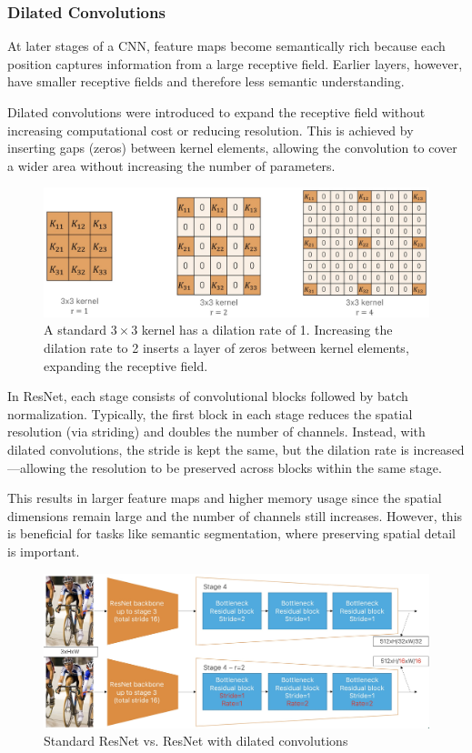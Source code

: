 \subsubsection{Dilated Convolutions}

At later stages of a CNN, feature maps become semantically rich because each position captures information from a large receptive field. Earlier layers, however, have smaller receptive fields and therefore less semantic understanding.

Dilated convolutions were introduced to expand the receptive field without increasing computational cost or reducing resolution. This is achieved by inserting gaps (zeros) between kernel elements, allowing the convolution to cover a wider area without increasing the number of parameters.

\begin{figure}[htbp]
  \centering
  \includegraphics[width=0.7\linewidth]{./img/dilated_convolutions.jpg}
  \caption{A standard $3 \times 3$ kernel has a dilation rate of 1. Increasing the dilation rate to 2 inserts a layer of zeros between kernel elements, expanding the receptive field.}
\end{figure}

In ResNet, each stage consists of convolutional blocks followed by batch normalization. Typically, the first block in each stage reduces the spatial resolution (via striding) and doubles the number of channels. Instead, with dilated convolutions, the stride is kept the same, but the dilation rate is increased—allowing the resolution to be preserved across blocks within the same stage.

This results in larger feature maps and higher memory usage since the spatial dimensions remain large and the number of channels still increases. However, this is beneficial for tasks like semantic segmentation, where preserving spatial detail is important.

\begin{figure}[htbp]
  \centering
  \includegraphics[width=0.7\linewidth]{./img/dilated_resnet.jpg}
  \caption{Standard ResNet vs. ResNet with dilated convolutions}
\end{figure}

